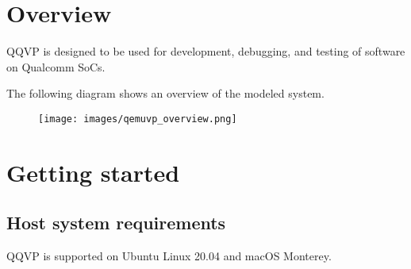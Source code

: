 %
%

\chapter{Overview}

QQVP is designed to be used for development, debugging, and testing of software on Qualcomm SoCs.

The following diagram shows an overview of the modeled system.

\begin{figure}[H]
  \texttt{[image: images/qemuvp\_overview.png]}
  \renewcommand{\thefigure}{\thechapter-\arabic{figure}}
\end{figure}



\chapter{Getting started}

\section{Host system requirements}

QQVP is supported on Ubuntu Linux 20.04 and macOS Monterey.


